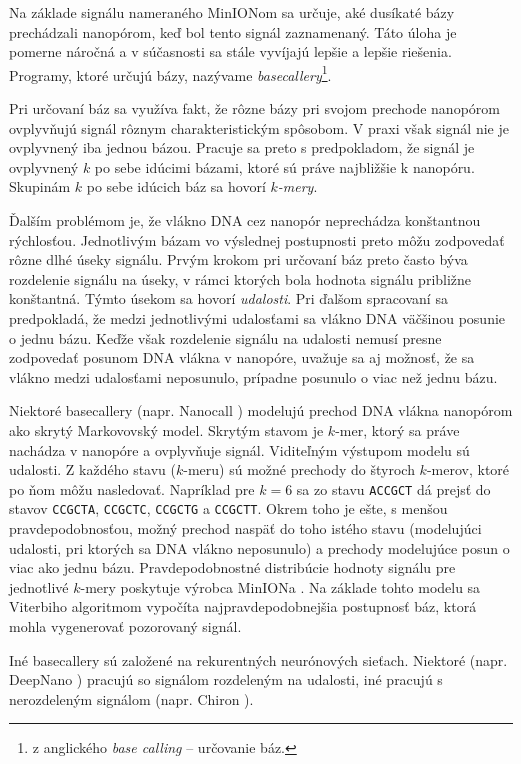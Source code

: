 Na základe signálu nameraného MinIONom sa určuje, aké dusíkaté bázy prechádzali nanopórom, keď bol
tento signál zaznamenaný. Táto úloha je pomerne náročná a v súčasnosti sa stále vyvíjajú lepšie a
lepšie riešenia. Programy, ktoré určujú bázy, nazývame \emph{basecallery}\footnote{z anglického \emph{base calling} -- určovanie báz.}.

Pri určovaní báz sa využíva fakt, že rôzne bázy pri svojom prechode nanopórom ovplyvňujú signál
rôznym charakteristickým spôsobom. V praxi však signál nie je ovplyvnený iba jednou bázou. Pracuje
sa preto s predpokladom, že signál je ovplyvnený $k$ po sebe idúcimi bázami, ktoré sú práve najbližšie
k nanopóru. Skupinám $k$ po sebe idúcich báz sa hovorí \emph{$k$-mery}.

Ďalším problémom je, že vlákno DNA cez nanopór neprechádza konštantnou rýchlosťou. Jednotlivým bázam vo 
výslednej postupnosti preto môžu zodpovedať rôzne dlhé úseky signálu. Prvým krokom pri určovaní báz 
preto často býva rozdelenie signálu na úseky, v rámci ktorých bola hodnota signálu približne konštantná.
Týmto úsekom sa hovorí \emph{udalosti}. Pri ďalšom spracovaní sa predpokladá, že medzi jednotlivými 
udalosťami sa vlákno DNA väčšinou posunie o jednu bázu. Keďže však rozdelenie signálu na udalosti nemusí
presne zodpovedať posunom DNA vlákna v nanopóre, uvažuje sa aj možnosť, že sa vlákno medzi udalosťami 
neposunulo, prípadne posunulo o viac než jednu bázu.


Niektoré basecallery (napr. Nanocall \cite{Nanocall2017}) modelujú prechod DNA vlákna nanopórom ako 
skrytý Markovovský model. Skrytým stavom je $k$-mer, ktorý sa práve nachádza v nanopóre a ovplyvňuje 
signál. Viditeľným výstupom modelu sú udalosti. Z každého stavu ($k$-meru) sú možné prechody do štyroch 
$k$-merov, ktoré po ňom môžu nasledovať. Napríklad pre $k=6$ sa zo stavu \texttt{ACCGCT} dá prejsť do
stavov \texttt{CCGCTA}, \texttt{CCGCTC}, \texttt{CCGCTG} a \texttt{CCGCTT}. Okrem toho je ešte, s menšou 
pravdepodobnosťou, možný prechod naspäť do toho istého stavu (modelujúci udalosti, pri ktorých sa DNA 
vlákno neposunulo) a prechody modelujúce posun o viac ako jednu bázu. Pravdepodobnostné distribúcie 
hodnoty signálu pre jednotlivé $k$-mery poskytuje výrobca MinIONa \cite{KmerModels}. Na základe tohto
modelu sa Viterbiho algoritmom vypočíta najpravdepodobnejšia postupnosť báz, ktorá mohla vygenerovať 
pozorovaný signál.

Iné basecallery sú založené na rekurentných neurónových sieťach. Niektoré (napr. DeepNano 
\cite{DeepNano2017}) pracujú so signálom rozdeleným na udalosti, iné pracujú s nerozdeleným signálom 
(napr. Chiron \cite{Chiron2017}).

